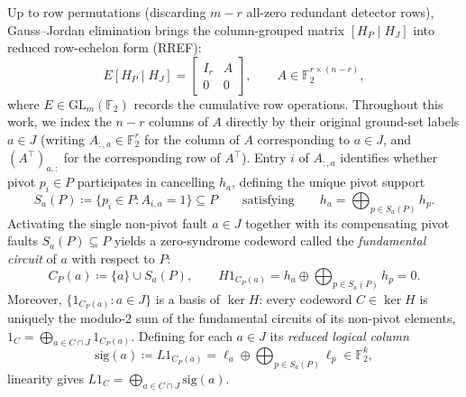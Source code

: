 \documentclass[12pt]{article}
\theoremstyle{definition}
\newcommand{\Ftwo}{\mathbb{F}_2}
\begin{document}
Up to row permutations (discarding $m - r$ all-zero redundant detector rows), Gauss--Jordan elimination brings the
column-grouped matrix $[H_P \mid H_J]$ into reduced row-echelon form (RREF):
\begin{equation}\label{eq:rref}
  E [H_P \mid H_J] = \begin{bmatrix} I_r & A \\ 0 & 0 \end{bmatrix}, \qquad A \in \Ftwo^{r \times (n-r)},
\end{equation}
where $E \in \mathrm{GL}_m(\Ftwo)$ records the cumulative row operations. Throughout this work, we index the $n -
r$ columns of $A$ directly by their original ground-set labels $a \in J$ (writing $A_{:, a} \in \Ftwo^r$ for the
column of $A$ corresponding to $a \in J$, and $(A^\top)_{a, :}$ for the corresponding row of $A^\top$). Entry $i$
of $A_{:, a}$ identifies whether pivot $p_i \in P$ participates in cancelling $h_a$, defining the unique pivot
support
\begin{equation}\label{eq:Sa_def}
  S_a(P) \coloneqq \{p_i \in P : A_{i, a} = 1\} \subseteq P \qquad\text{satisfying}\qquad
  h_a = \bigoplus_{p \in S_a(P)} h_p.
\end{equation}
Activating the single non-pivot fault $a \in J$ together with its compensating pivot faults $S_a(P) \subseteq P$
yields a zero-syndrome codeword called the \emph{fundamental circuit} of $a$ with respect to $P$:
\begin{equation}\label{eq:fund_circuit}
  C_P(a) \coloneqq \{a\} \cup S_a(P), \qquad H 1_{C_P(a)} = h_a \oplus \bigoplus_{p \in S_a(P)} h_p = 0.
\end{equation}
Moreover, $\{1_{C_P(a)} : a \in J\}$ is a basis of $\ker H$: every codeword $C \in \ker H$ is uniquely the modulo-2
sum of the fundamental circuits of its non-pivot elements, $1_C = \bigoplus_{a \in C \cap J} 1_{C_P(a)}$. Defining
for each $a \in J$ its \emph{reduced logical column}
\begin{equation}\label{eq:sig_def}
  \mathrm{sig}(a) \coloneqq L 1_{C_P(a)} = \ell_a \oplus \bigoplus_{p \in S_a(P)} \ell_p \in \Ftwo^k,
\end{equation}
linearity gives $L 1_C = \bigoplus_{a \in C \cap J} \mathrm{sig}(a)$.
\end{document}
